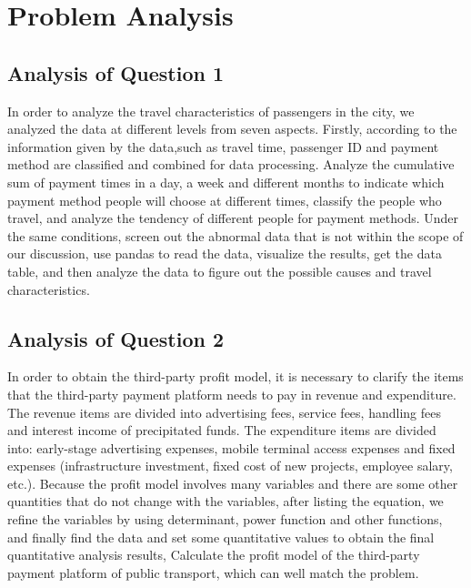 \documentclass[../mcmpaper]{subfiles}
\begin{document}
\section{Problem Analysis}
\subsection{Analysis of Question 1}
In order to analyze the travel characteristics of passengers in the city, we analyzed the data at different levels from seven aspects. Firstly, according to the information given by the data,such as travel time, passenger ID and payment method are classified and combined for data processing. Analyze the cumulative sum of payment times in a day, a week and different months to indicate which payment method people will choose at different times, classify the people who travel, and analyze the tendency of different people for payment methods. Under the same conditions, screen out the abnormal data that is not within the scope of our discussion, use pandas to read the data, visualize the results, get the data table, and then analyze the data to figure out the possible causes and travel characteristics.
\subsection{Analysis of Question 2}
In order to obtain the third-party profit model, it is necessary to clarify the items that the third-party payment platform needs to pay in revenue and expenditure. The revenue items are divided into advertising fees, service fees, handling fees and interest income of precipitated funds. The expenditure items are divided into: early-stage advertising expenses, mobile terminal access expenses and fixed expenses (infrastructure investment, fixed cost of new projects, employee salary, etc.). Because the profit model involves many variables and there are some other quantities that do not change with the variables, after listing the equation, we refine the variables by using determinant, power function and other functions, and finally find the data and set some quantitative values to obtain the final quantitative analysis results, Calculate the profit model of the third-party payment platform of public transport, which can well match the problem.
\end{document}
